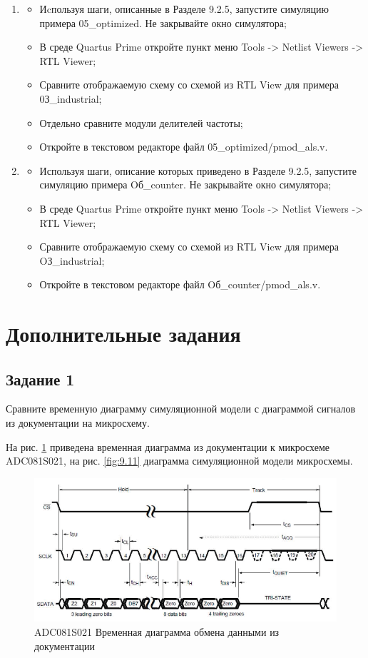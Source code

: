 \documentclass[a4paper,14pt]{article}
\begin{document}
\begin{enumerate}
		\item 
		\begin{itemize}
			\item Иcпользуя шаги, описанные в Разделе 9.2.5, запустите симуляцию примера 05\_optimized. Не закрывайте окно симулятора;
			\item В среде Quartus Prime откройте пункт меню Tools -> Netlist Viewers -> RTL Viewer;
			\item Сравните отображаемую схему со схемой из RТL View для примера 0З\_industrial;
			\item Отдельно сравните модули делителей частоты;
			\item Откройте в текстовом редакторе файл 05\_optimized/pmod\_als.v.
		\end{itemize}
	
		\item 
		\begin{itemize}
			\item Используя шаги, описание которых приведено в Разделе 9.2.5, запустите симуляцию примера Oб\_counter. Не закрывайте окно симулятора;
			\item В среде Quartus Prime откройте пункт меню Tools -> Netlist Viewers -> RTL Viewer;
			\item Сравните отображаемую схему со схемой из RТL View для примера OЗ\_industrial;
			\item Откройте в текстовом редакторе файл Oб\_counter/pmod\_als.v.
		\end{itemize}
	\end{enumerate}
	
	\section{Дополнительные задания}
	
	\subsection{Задание 1}
	
	Сравните временную диаграмму симуляционной модели с	диаграммой сигналов из документации на микросхему. 		
	
	На рис. \ref{fig:9.7} приведена временная диаграмма из документации к микросхеме ADC081S021, на рис. \ref{fig:9.11} диаграмма симуляционной модели микросхемы.
	
	\begin{figure}[H]
		\centering
		\includegraphics[width=0.9\linewidth]{images/9_7}
		\caption{ADC081S021 Временная диаграмма обмена данными из документации}
		\label{fig:9.7}
	\end{figure}
	
\end{document}
